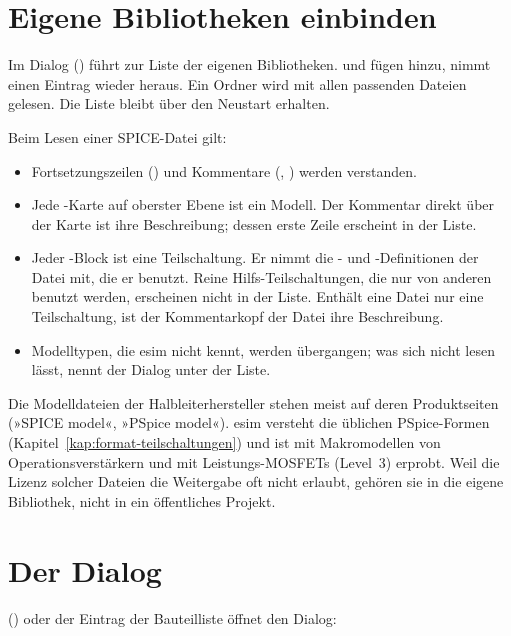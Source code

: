 \section{Eigene Bibliotheken einbinden}

Im Dialog  () führt
 zur Liste der eigenen Bibliotheken.
 und  fügen hinzu,
 nimmt einen Eintrag wieder heraus. Ein Ordner wird mit
allen passenden Dateien gelesen. Die Liste bleibt über den Neustart
erhalten.

Beim Lesen einer SPICE-Datei gilt:
\begin{itemize}
  \item Fortsetzungszeilen (\code{+}) und Kommentare (\code{*}, \code{;})
    werden verstanden.
  \item Jede -Karte auf oberster Ebene ist ein Modell. Der
    Kommentar direkt über der Karte ist ihre Beschreibung; dessen erste
    Zeile erscheint in der Liste.
  \item Jeder -Block ist eine Teilschaltung. Er nimmt die
    - und -Definitionen der Datei mit, die er
    benutzt. Reine Hilfs-Teilschaltungen, die nur von anderen benutzt
    werden, erscheinen nicht in der Liste. Enthält eine Datei nur eine
    Teilschaltung, ist der Kommentarkopf der Datei ihre Beschreibung.
  \item Modelltypen, die esim nicht kennt, werden übergangen; was sich
    nicht lesen lässt, nennt der Dialog unter der Liste.
\end{itemize}

\begin{hinweis}
  Die Modelldateien der Halbleiterhersteller stehen meist auf deren
  Produktseiten (»SPICE model«, »PSpice model«). esim versteht die
  üblichen PSpice-Formen (Kapitel~\ref{kap:format-teilschaltungen}) und
  ist mit Makromodellen von Operationsverstärkern und mit
  Leistungs-MOSFETs (Level~3) erprobt. Weil die Lizenz solcher Dateien
  die Weitergabe oft nicht erlaubt, gehören sie in die eigene Bibliothek,
  nicht in ein öffentliches Projekt.
\end{hinweis}

\section{Der Dialog}

\pfad{} ()
oder der Eintrag  der Bauteilliste öffnet
den Dialog:

